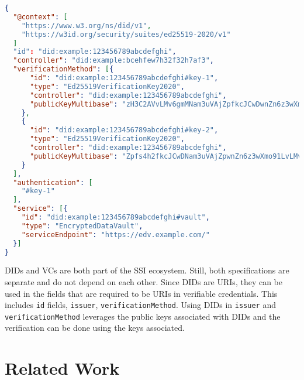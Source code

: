 \begin{lstlisting}[language=json, label={lst:did-doc-example}, caption={Example\acrlong{DID} document \parencite{reed_sporny_longley_allen_grant_sabadello_2021}}]
{
  "@context": [
    "https://www.w3.org/ns/did/v1",
    "https://w3id.org/security/suites/ed25519-2020/v1"
  ]
  "id": "did:example:123456789abcdefghi",
  "controller": "did:example:bcehfew7h32f32h7af3",
  "verificationMethod": [{
      "id": "did:example:123456789abcdefghi#key-1",
      "type": "Ed25519VerificationKey2020", 
      "controller": "did:example:123456789abcdefghi",
      "publicKeyMultibase": "zH3C2AVvLMv6gmMNam3uVAjZpfkcJCwDwnZn6z3wXmqPV"
    }, 
    {
      "id": "did:example:123456789abcdefghi#key-2",
      "type": "Ed25519VerificationKey2020", 
      "controller": "did:example:123456789abcdefghi",
      "publicKeyMultibase": "Zpfs4h2fkcJCwDNam3uVAjZpwnZn6z3wXmo91LvLMv6A"
    }
  ],
  "authentication": [
    "#key-1"
  ],
  "service": [{
    "id": "did:example:123456789abcdefghi#vault",
    "type": "EncryptedDataVault",
    "serviceEndpoint": "https://edv.example.com/"
  }]
}
\end{lstlisting}

\acrshort{DID}s and \acrshort{VC}s are both part of the \acrfull{SSI} ecosystem. Still, both specifications are separate and do not depend on each other. Since \acrshort{DID}s are \acrshort{URI}s, they can be used in the fields that are required to be \acrshort{URI}s in verifiable credentials. This includes \lstinline{id} fields, \lstinline{issuer}, \lstinline{verificationMethod}. Using \acrshort{DID}s in \lstinline{issuer} and \lstinline{verificationMethod} leverages the public keys associated with \acrshort{DID}s and the verification can be done using the keys associated.

\section{Related Work}

